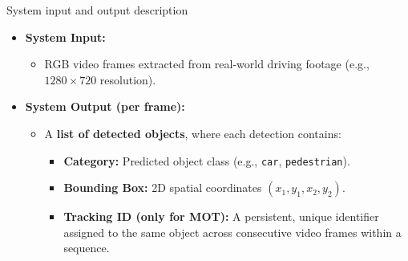 \documentclass{beamer}
\begin{document}
\begin{frame}{System input and output description}
    \begin{itemize}
        \item \textbf{System Input:} 
        \begin{itemize}
            \item RGB video frames extracted from real-world driving footage (e.g., $1280 \times 720$ resolution).
        \end{itemize}
        \vspace{0.3cm}
        \item \textbf{System Output (per frame):}
        \begin{itemize}
            \item A \textbf{list of detected objects}, where each detection contains:
            \begin{itemize}
                \item \textbf{Category:} Predicted object class (e.g., \texttt{car}, \texttt{pedestrian}).
                \item \textbf{Bounding Box:} 2D spatial coordinates $(x_1, y_1, x_2, y_2)$.
                \item \textbf{Tracking ID (only for MOT):} A persistent, unique identifier assigned to the same object across consecutive video frames within a sequence.
            \end{itemize}
        \end{itemize}
    \end{itemize}
\end{frame}
\end{document}
